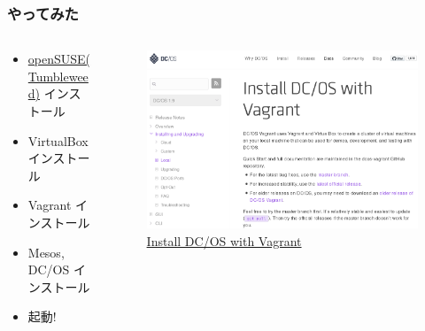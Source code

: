 \documentclass[aspectratio=169,11pt,hyperref={colorlinks=true}]{beamer}
\begin{document}
\begin{frame}
  \frametitle{やってみた}
  \begin{columns}[T]
    \begin{column}{.55\textwidth}
      \begin{itemize}
        \item \href{https://en.opensuse.org/Portal:Tumbleweed}{openSUSE(Tumbleweed)} インストール
        \item VirtualBox インストール
        \item Vagrant インストール
        \item Mesos, DC/OS インストール
        \item 起動!
      \end{itemize}
    \end{column}
    \begin{column}{.5\textwidth}
      \begin{figure}
        \caption{\href{https://dcos.io/docs/1.9/installing/local/}{Install DC/OS with Vagrant}}
        \includegraphics[width=1.0\textwidth]{dcos-vagrant.png}
      \end{figure}
    \end{column}
  \end{columns}
\end{frame}
\end{document}
